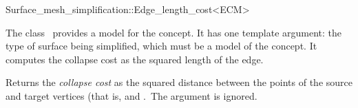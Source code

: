 

\begin{ccRefClass}{Surface_mesh_simplification::Edge_length_cost<ECM>}


\ccDefinition

The class \ccRefName\ provides a model for the  concept.
It has one template argument: the type of surface being simplified,
which must be a model of the  concept.
It computes the collapse cost as the squared length of the edge.


\ccIsModel
{}

\ccCreation
{}  %

  {Returns the {\em collapse cost} as the squared distance between the points
  of the source and target vertices (that is,  and .\
  The  argument is ignored.
  }

\end{ccRefClass}


